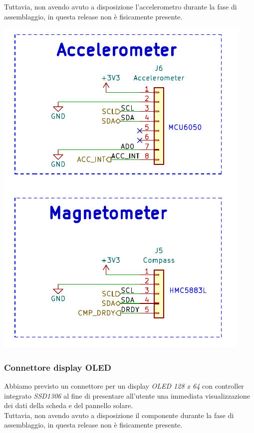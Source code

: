 Tuttavia, non avendo avuto a disposizione l'accelerometro durante la
fase di assemblaggio, in questa release non è fisicamente presente.

\begin{center}
\includegraphics[scale=0.6]{figures/image31.png}
\captionsetup{type=figure}
\end{center}

\hypertarget{connettore-display-oled}{%
\subsubsection{\texorpdfstring{Connettore display OLED\\
}{Connettore display OLED }}\label{connettore-display-oled}}

Abbiamo previsto un connettore per un display \emph{OLED 128 x 64} con
controller integrato \emph{SSD1306} al fine di presentare all'utente una
immediata visualizzazione dei dati della scheda e del pannello solare.\\
Tuttavia, non avendo avuto a disposizione il componente durante la fase
di assemblaggio, in questa release non è fisicamente presente.

